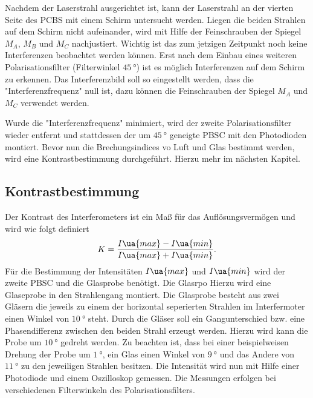 Nachdem der Laserstrahl ausgerichtet ist, kann der Laserstrahl an der vierten Seite des PCBS
mit einem Schirm untersucht werden.
Liegen die beiden Strahlen auf dem Schirm nicht aufeinander, wird mit Hilfe der
Feinschrauben der Spiegel $M_A$, $M_B$ und $M_C$ nachjustiert. Wichtig ist das zum
jetzigen Zeitpunkt noch keine Interferenzen beobachtet werden können. Erst nach
dem Einbau eines weiteren Polarisationsfilter (Filterwinkel $\SI{45}{\degree}$)
ist es möglich Interferenzen auf dem Schirm zu erkennen.
Das Interferenzbild soll so eingestellt werden, dass die
"Interferenzfrequenz" null ist, dazu können die Feinschrauben der Spiegel
$M_A$ und $M_C$ verwendet werden.

Wurde die "Interferenzfrequenz" minimiert, wird der zweite Polarisationsfilter wieder
entfernt und stattdessen der um $\SI{45}{\degree}$ geneigte PBSC mit den Photodioden
montiert. Bevor nun die Brechungsindices vo Luft und Glas bestimmt werden, wird eine
Kontrastbestimmung durchgeführt. Hierzu mehr im nächsten Kapitel.

\subsection{Kontrastbestimmung}
Der Kontrast des Interferometers ist ein Maß für das Auflösungsvermögen und wird
wie folgt definiert
\begin{equation}
  \label{eq:kontrast}
  K = \frac{I\ua{max} - I\ua{min}}{I\ua{max}+I\ua{min}}.
\end{equation}
Für die Bestimmung der Intensitäten $I\ua{max}$ und $I\ua{min}$ wird der zweite
PBSC und die Glasprobe benötigt.
Die Glasrpo
Hierzu wird eine Glaseprobe in den Strahlengang montiert. Die Glasprobe
besteht aus zwei Gläsern die jeweils zu einem der horizontal seperierten Strahlen
im Interfermoter einen Winkel von $\SI{10}{\degree}$ steht. Durch die Gläser soll
ein Gangunterschied bzw. eine Phasendifferenz zwischen den beiden Strahl erzeugt werden.
Hierzu wird kann die Probe um $\SI{10}{\degree}$ gedreht werden. Zu beachten ist, dass
bei einer beispielweisen Drehung der Probe um $\SI{1}{\degree}$, ein Glas
einen Winkel von $\SI{9}{\degree}$ und das Andere von $\SI{11}{\degree}$ zu den jeweiligen
Strahlen besitzen. Die Intensität wird nun mit Hilfe einer Photodiode und einem Oszilloskop
gemessen. Die Messungen erfolgen bei verschiedenen Filterwinkeln des Polarisationsfilters.
